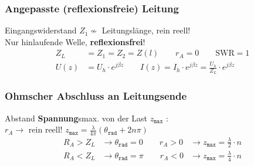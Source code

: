 %
%

\subsubsection{Angepasste (reflexionsfreie) Leitung}
Eingangswiderstand $ Z_1\nsim$ Leitungslänge, rein reell!\\
Nur hinlaufende Welle, \textbf{reflexionsfrei}!
\begin{align*}
	Z_L          & = Z_1 = Z_2 = Z(l) \qquad
	r_A          =0 \qquad 
	\mathrm{SWR} = 1  \\
	U(z)         & = U_h\cdot e ^{j\beta z}  \qquad           
	I(z)         = I_h \cdot e^{j\beta z} = \frac{U_h}{Z_L}\cdot e^{j\beta z}
\end{align*}

\subsubsection{Ohmscher Abschluss an Leitungsende}
Abstand \textbf{Spannung}smax. von der Last $ z_{\texttt{max}} $ :\\
$ r_A \rightarrow$ rein reell! \qquad $ z_{\texttt{max}} = \frac{\lambda}{4\pi} (\theta_{\texttt{rad}}+2n\pi)$
\begin{align*}
	R_A > Z_L & \rightarrow\theta_{\texttt{rad}} = 0 \qquad r_A >0
	& \rightarrow z_\texttt{max}=\frac{\lambda}{2}\cdot n\\
	R_A < Z_L& \rightarrow\theta_{\texttt{rad}} = \pi \qquad r_A <0                          
	& \rightarrow z_\texttt{max}=\frac{\lambda}{4}\cdot n
	\end{align*}


